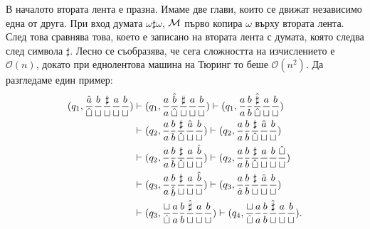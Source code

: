 \begin{example}
В началото втората лента е празна. Имаме две глави, които се движат независимо една от друга.
При вход думата $\omega\sharp\omega$, $\mathcal{M}$ първо копира $\omega$ върху втората лента.
След това сравнява това, което е записано на втората лента с думата, която следва след символа $\sharp$.
Лесно се съобразява, че сега сложността на изчислението е $\mathcal{O}(n)$,
докато при еднолентова машина на Тюринг то беше $\mathcal{O}(n^2)$.
Да разгледаме един пример:
\begin{align*}
  (q_1, \frac{\hat{a}}{\hat{\sqcup}}\frac{b}{\sqcup}\frac{\sharp}{\sqcup}\frac{a}{\sqcup}\frac{b}{\sqcup}) & \vdash (q_1, \frac{a}{a}\frac{\hat{b}}{\hat{\sqcup}}\frac{\sharp}{\sqcup}\frac{a}{\sqcup}\frac{b}{\sqcup}) \vdash (q_1, \frac{a}{a}\frac{b}{b}\frac{\hat{\sharp}}{\hat{\sqcup}}\frac{a}{\sqcup}\frac{b}{\sqcup}) \\
                                                                                                           & \vdash (q_2, \frac{a}{a}\frac{b}{b}\frac{\sharp}{\hat{\sqcup}}\frac{\hat{a}}{\sqcup}\frac{b}{\sqcup}) \vdash (q_2, \frac{a}{a}\frac{b}{b}\frac{\sharp}{\hat{\sqcup}}\frac{\hat{a}}{\sqcup}\frac{b}{\sqcup})\\
                                                                                                           & \vdash (q_2, \frac{a}{a}\frac{b}{b}\frac{\sharp}{\hat{\sqcup}}\frac{a}{\sqcup}\frac{\hat{b}}{\sqcup}) \vdash (q_2, \frac{a}{a}\frac{b}{b}\frac{\sharp}{\hat{\sqcup}}\frac{a}{\sqcup}\frac{b}{\sqcup}\frac{\hat{\sqcup}}{\sqcup})\\
                                                                                                           & \vdash (q_3, \frac{a}{a}\frac{b}{\hat{b}}\frac{\sharp}{\sqcup}\frac{a}{\sqcup}\frac{\hat{b}}{\sqcup}) \vdash (q_3, \frac{a}{\hat{a}}\frac{b}{b}\frac{\sharp}{\sqcup}\frac{\hat{a}}{\sqcup}\frac{b}{\sqcup}) \\
                                                                                                           & \vdash (q_3, \frac{\sqcup}{\hat{\sqcup}}\frac{a}{a}\frac{b}{b}\frac{\hat{\sharp}}{\sqcup}\frac{a}{\sqcup}\frac{b}{\sqcup}) \vdash (q_4, \frac{\sqcup}{\hat{\sqcup}}\frac{a}{a}\frac{b}{b}\frac{\hat{\sharp}}{\sqcup}\frac{a}{\sqcup}\frac{b}{\sqcup}).
\end{align*}

\end{example}




